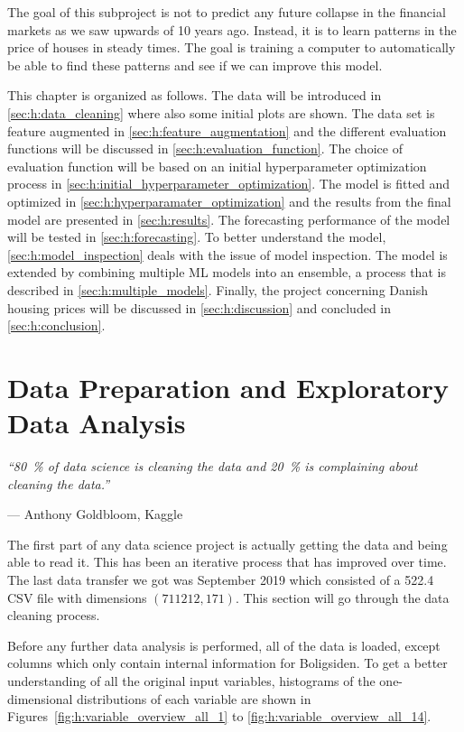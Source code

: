 The goal of this subproject is not to predict any future collapse in the financial markets as we saw upwards of 10 years ago. Instead, it is to learn patterns in the price of houses in steady times. The goal is training a computer to automatically be able to find these patterns and see if we can improve this model.

This chapter is organized as follows. The data will be introduced in  \autoref{sec:h:data_cleaning} where also some initial plots are shown. The data set is feature augmented in \autoref{sec:h:feature_augmentation} and the different evaluation functions will be discussed in \autoref{sec:h:evaluation_function}. The choice of evaluation function will be based on an initial hyperparameter optimization process in \autoref{sec:h:initial_hyperparameter_optimization}. The model is fitted and optimized in \autoref{sec:h:hyperparamater_optimization} and the results from the final model are presented in \autoref{sec:h:results}. The forecasting performance of the model will be tested in \autoref{sec:h:forecasting}. To better understand the model, \autoref{sec:h:model_inspection} deals with the issue of model inspection. The model is extended by combining multiple ML models into an ensemble, a process that is described in \autoref{sec:h:multiple_models}. Finally, the project concerning Danish housing prices will be discussed in \autoref{sec:h:discussion} and concluded in \autoref{sec:h:conclusion}.

\section{Data Preparation and Exploratory Data Analysis}
\label{sec:h:data_cleaning}
\epigraph{\textit{``\SI{80}{\percent} of data science is cleaning the data and \SI{20}{\percent} is complaining about cleaning the data.''}}{--- Anthony Goldbloom, Kaggle}


The first part of any data science project is actually getting the data and being able to read it. This has been an iterative process that has improved over time. The last data transfer we got was September  2019 which consisted of a \SI{522.4}{\mega\byte} CSV file with dimensions $(\num{711212}, \num{171})$. This section will go through the data cleaning process.

Before any further data analysis is performed, all of the data is loaded, except columns which only contain internal information for Boligsiden. To get a better understanding of all the original input variables, histograms of the one-dimensional distributions of each variable are shown in Figures~\ref{fig:h:variable_overview_all_1} to \ref{fig:h:variable_overview_all_14}.

